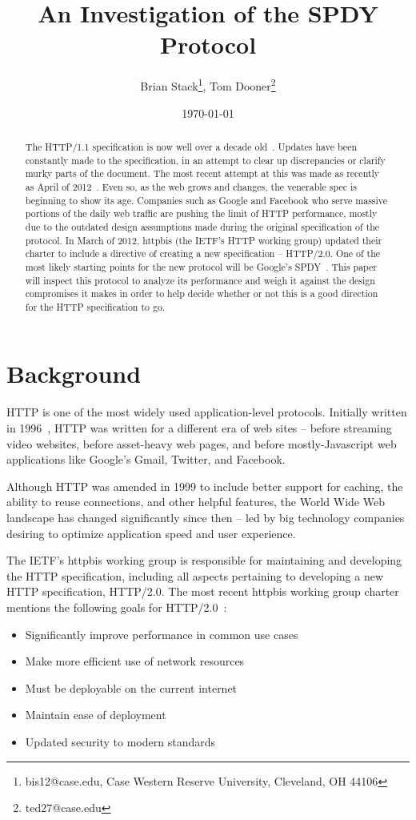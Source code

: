 \documentclass[11pt,letterpaper,notitlepage]{article}
\title{An Investigation of the SPDY Protocol}
\date{\today}
\author{Brian Stack\thanks{ bis12@case.edu, Case Western Reserve University,
Cleveland, OH 44106}, Tom Dooner\thanks{ ted27@case.edu }}
\begin{document}
\maketitle
\setcounter{tocdepth}{1}
\tableofcontents
\begin{abstract}
The HTTP/1.1 specification is now well over a decade old~\cite{rfc2616}. Updates
have been constantly made to the specification, in an attempt to clear up
discrepancies or clarify murky parts of the document.  The most recent attempt
at this was made as recently as April of 2012~\cite{rfc6585}.  Even so, as the web grows
and changes, the venerable spec is beginning to show its age.  Companies such as
Google and Facebook who serve massive portions of the daily web traffic are
pushing the limit of HTTP performance, mostly due to the outdated design
assumptions made during the original specification of the protocol.  In March of
2012, httpbis (the IETF's HTTP working group) updated their charter to
include a directive of creating a new specification -- HTTP/2.0.  One of the
most likely starting points for the new protocol will be Google's
SPDY~\cite{spdyspec}.  This paper will inspect this protocol to analyze its
performance and weigh it against the design compromises it makes in order to
help decide whether or not this is a good direction for the HTTP specification
to go.
\end{abstract}

\section{Background}
\label{sec:background}
HTTP is one of the most widely used application-level protocols. Initially
written in 1996~\cite{http1rfc}, HTTP was written for a different era of web
sites -- before streaming video websites, before asset-heavy web pages, and
before mostly-Javascript web applications like Google's Gmail, Twitter, and
Facebook.

Although HTTP was amended in 1999 to include better support for caching, the
ability to reuse connections, and other helpful features, the World Wide Web
landscape has changed significantly since then -- led by big technology
companies desiring to optimize application speed and user experience.

The IETF's httpbis working group is responsible for maintaining and developing
the HTTP specification, including all aspects pertaining to developing a new
HTTP specification, HTTP/2.0. The most recent httpbis working group charter
mentions the following goals for HTTP/2.0~\cite{httpbis-charter}:
\begin{itemize}
\item Significantly improve performance in common use cases
\item Make more efficient use of network resources
\item Must be deployable on the current internet
\item Maintain ease of deployment
\item Updated security to modern standards
\end{itemize}
\end{document}
